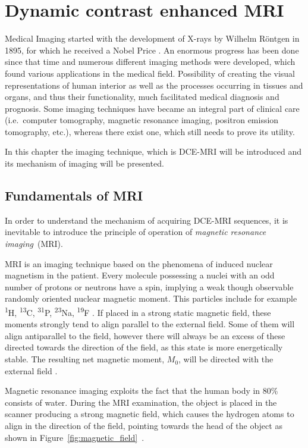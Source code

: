 \chapter{Dynamic contrast enhanced MRI}
	
Medical Imaging started with the development of X-rays by Wilhelm Röntgen in 1895, for which he received a Nobel Price \cite{rontgen1896new}. 
An enormous progress has been done since that time and numerous different imaging methods were developed, which found various applications in the medical field. Possibility of creating the visual representations of human interior as well as the processes occurring in tissues and organs, and thus their functionality, much facilitated medical diagnosis and prognosis.   
Some imaging techniques have became an integral part of clinical care (i.e.~computer tomography, magnetic resonance imaging, positron emission tomography, etc.), whereas there exist one, which still needs to prove its utility. 

In this chapter the imaging technique, which is DCE-MRI will be introduced and its mechanism of imaging will be presented.

\section{Fundamentals of MRI}
In order to understand the mechanism of acquiring DCE-MRI sequences, it is inevitable to introduce the principle of operation of \textit{magnetic resonance imaging}~(MRI).

MRI is an imaging technique based on the phenomena of induced nuclear  magnetism in the patient. Every molecule possessing a nuclei with an odd number of protons or neutrons  have a spin, implying a weak though observable randomly oriented nuclear magnetic moment. 
This particles include for example \textsuperscript{1}H, \textsuperscript{13}C, \textsuperscript{31}P, \textsuperscript{23}Na, \textsuperscript{19}F \nocite{bronzino1999biomedical}\cite{biomedical_hanbook_imaging, grover2015magnetic}. If placed in a strong static magnetic field, these moments strongly tend to align parallel to the external field. Some of them will align antiparallel to the field, however there will always be an excess of these directed towards the direction of the field, as this state is more energetically stable. The resulting net magnetic moment, $M_0$, will be directed with the external field \cite{bushong2014magnetic}.

Magnetic resonance imaging exploits the fact that the human body in 80\% consists of water. During the MRI examination, the object is placed in the scanner producing a strong magnetic field, which causes the hydrogen atoms to align in the direction of the field, pointing towards the head of the object as shown in Figure~\ref{fig:magnetic_field}~\cite{bushong2014magnetic}. 

